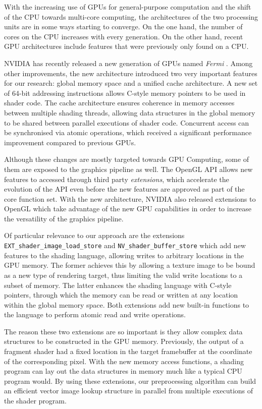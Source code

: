 \documentclass[11pt,a4paper,twoside]{article}
\begin{document}
With the increasing use of GPUs for general-purpose computation and the shift of the CPU towards multi-core computing, the architectures of the two processing units are in some ways starting to converge. On the one hand, the number of cores on the CPU increases with every generation. On the other hand, recent GPU architectures include features that were previously only found on a CPU.

NVIDIA has recently released a new generation of GPUs named \emph{Fermi} \cite{Fermi}. Among other improvements, the new architecture introduced two very important features for our research: global memory space and a unified cache architecture. A new set of 64-bit addressing instructions allows C-style memory pointers to be used in shader code. The cache architecture ensures coherence in memory accesses between multiple shading threads, allowing data structures in the global memory to be shared between parallel executions of shader code. Concurrent access can be synchronised via atomic operations, which received a significant performance improvement compared to previous GPUs.

Although these changes are mostly targeted towards GPU Computing, some of them are exposed to the graphics pipeline as well. The OpenGL API allows new features to accessed through third party \emph{extensions}, which accelerate the evolution of the API even before the new features are approved as part of the core function set. With the new architecture, NVIDIA also released extensions to OpenGL which take advantage of the new GPU capabilities in order to increase the versatility of the graphics pipeline.

Of particular relevance to our approach are the extensions {\tt EXT\_shader\_image\_load\_store} and {\tt NV\_shader\_buffer\_store} which add new features to the shading language, allowing writes to arbitrary locations in the GPU memory. The former achieves this by allowing a texture image to be bound as a new type of rendering target, thus limiting the valid write locations to a subset of memory. The latter enhances the shading language with C-style pointers, through which the memory can be read or written at any location within the global memory space. Both extensions add new built-in functions to the language to perform atomic read and write operations.

The reason these two extensions are so important is they allow complex data structures to be constructed in the GPU memory. Previously, the output of a fragment shader had a fixed location in the target framebuffer at the coordinate of the corresponding pixel. With the new memory access functions, a shading program can lay out the data structures in memory much like a typical CPU program would. By using these extensions, our preprocessing algorithm can build an efficient vector image lookup structure in parallel from multiple executions of the shader program.
\end{document}
